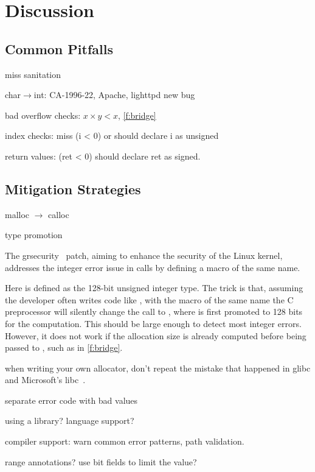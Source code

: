 \section{Discussion}
\label{s:disc}

\subsection{Common Pitfalls}

miss sanitation

char$\to$int: 
CA-1996-22,
Apache,
lighttpd new bug

bad overflow checks: $x \times y < x$, 
\autoref{f:bridge}

index checks:
miss (i < 0) or should declare i as unsigned

return values: (ret < 0)
should declare ret as signed.

\subsection{Mitigation Strategies}

malloc $\to$ calloc

type promotion

The grsecurity~\cite{grsecurity} patch, aiming to enhance the
security of the Linux kernel, addresses the integer error issue
in  calls by defining a macro of the same name.
%

%
Here  is defined as the 128-bit unsigned integer
type.  The trick is that, assuming the developer often writes code
like , with the macro of the same name
the C preprocessor will silently change the call to
, where  is first
promoted to 128 bits for the computation.  This should be large
enough to detect most integer errors.  However, it does not work
if the allocation size is already computed before being passed to
, such as in \autoref{f:bridge}.

when writing your own allocator, don't repeat the mistake that
happened in glibc and Microsoft's libc~\cite{rus-cert:calloc}.

separate error code with bad values

using a library? language support?

compiler support: warn common error patterns,
path validation.

range annotations? use bit fields to limit the value?
